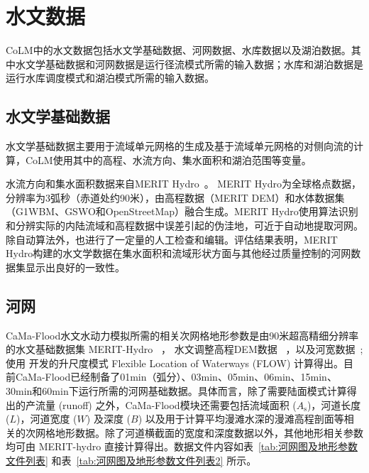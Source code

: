 \section{水文数据}\label{水文数据}

CoLM中的水文数据包括水文学基础数据、河网数据、水库数据以及湖泊数据。其中水文学基础数据和河网数据是运行径流模式所需的输入数据；水库和湖泊数据是运行水库调度模式和湖泊模式所需的输入数据。

\subsection{水文学基础数据}
水文学基础数据主要用于流域单元网格的生成及基于流域单元网格的对侧向流的计算，CoLM使用其中的高程、水流方向、集水面积和湖泊范围等变量。

水流方向和集水面积数据来自MERIT Hydro~\citep{yamazaki2019merit}。 MERIT Hydro为全球格点数据，分辨率为3弧秒（赤道处约90米），由高程数据（MERIT DEM）和水体数据集（G1WBM、GSWO和OpenStreetMap）融合生成。MERIT Hydro使用算法识别和分辨实际的内陆流域和高程数据中误差引起的伪洼地，可近于自动地提取河网。除自动算法外，也进行了一定量的人工检查和编辑。评估结果表明，MERIT Hydro构建的水文学数据在集水面积和流域形状方面与其他经过质量控制的河网数据集显示出良好的一致性。

\subsection{河网}
CaMa-Flood水文水动力模拟所需的相关次网格地形参数是由90米超高精细分辨率的水文基础数据集 MERIT-Hydro ~\citep{yamazaki2019merit}，
水文调整高程DEM数据 ~\citep{yamazaki2017high,yamazaki2012analysis}，以及河宽数据~\citep{yamazaki2014development};
使用 \citet{yamazaki2009deriving} 开发的升尺度模式 Flexible Location of Waterways (FLOW) 计算得出。目前CaMa-Flood已经制备了01min（弧分）、03min、05min、06min、15min、30min和60min下运行所需的河网基础数据。具体而言，除了需要陆面模式计算得出的产流量 (runoff) 之外，CaMa-Flood模块还需要包括流域面积 ($A_{\mathrm {s}} $)，河道长度 ($L$)，河道宽度 ($W$) 及深度 ($B$) 以及用于计算平均漫滩水深的漫滩高程剖面等相关的次网格地形数据。除了河道横截面的宽度和深度数据以外，其他地形相关参数均可由 MERIT-hydro 直接计算得出。数据文件内容如表~\ref{tab:河网图及地形参数文件列表} 和表~\ref{tab:河网图及地形参数文件列表2} 所示。 

